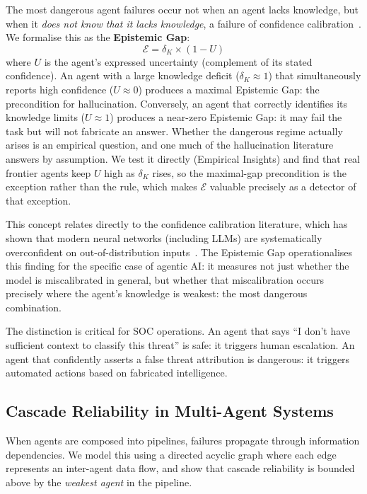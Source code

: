 \documentclass[journal,compsoc]{IEEEtran}
\begin{document}
The most dangerous agent failures occur not when an agent lacks knowledge,
but when it \textit{does not know that it lacks knowledge}, a failure of
confidence calibration~\cite{guo2017calibration}. We formalise this as the
\textbf{Epistemic Gap}:
\[
  \mathcal{E} = \delta_K \times (1 - U)
\]
where $U$ is the agent's expressed uncertainty (complement of its stated
confidence). An agent with a large knowledge deficit ($\delta_K \approx 1$)
that simultaneously reports high confidence ($U \approx 0$) produces a
maximal Epistemic Gap: the precondition for hallucination. Conversely, an
agent that correctly identifies its knowledge limits ($U \approx 1$) produces
a near-zero Epistemic Gap: it may fail the task but will not fabricate
an answer. Whether the dangerous regime actually arises is an empirical
question, and one much of the hallucination literature answers by
assumption. We test it directly (Empirical Insights) and find that real
frontier agents keep $U$ high as $\delta_K$ rises, so the maximal-gap
precondition is the exception rather than the rule, which makes
$\mathcal{E}$ valuable precisely as a detector of that exception.

This concept relates directly to the confidence calibration literature, which
has shown that modern neural networks (including LLMs) are systematically
overconfident on out-of-distribution inputs~\cite{guo2017calibration}. The
Epistemic Gap operationalises this finding for the specific case of agentic
AI: it measures not just whether the model is miscalibrated in general, but
whether that miscalibration occurs precisely where the agent's knowledge is
weakest: the most dangerous combination.

The distinction is critical for SOC operations. An agent that says
``I don't have sufficient context to classify this threat'' is safe: it
triggers human escalation. An agent that confidently asserts a false threat
attribution is dangerous: it triggers automated actions based on fabricated
intelligence.

\subsection{Cascade Reliability in Multi-Agent Systems}

When agents are composed into pipelines, failures propagate through
information dependencies. We model this using a directed acyclic graph
where each edge represents an inter-agent data flow, and show that cascade
reliability is bounded above by the \textit{weakest agent} in the pipeline.
\end{document}
